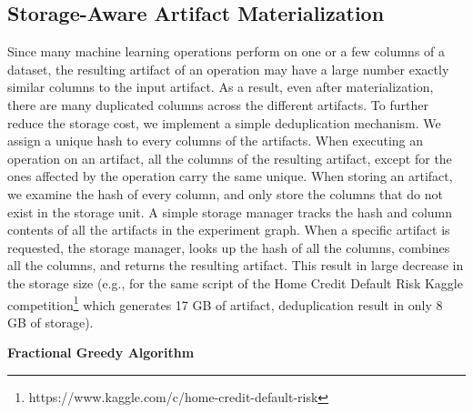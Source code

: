 \subsection{Storage-Aware Artifact Materialization}
Since many machine learning operations perform on one or a few columns of a dataset, the resulting artifact of an operation may have a large number exactly similar columns to the input artifact.
As a result, even after materialization, there are many duplicated columns across the different artifacts.
To further reduce the storage cost, we implement a simple deduplication mechanism.
We assign a unique hash to every columns of the artifacts.
When executing an operation on an artifact, all the columns of the resulting artifact, except for the ones affected by the operation carry the same unique.
When storing an artifact, we examine the hash of every column, and only store the columns that do not exist in the storage unit.
A simple storage manager tracks the hash and column contents of all the artifacts in the experiment graph.
When a specific artifact is requested, the storage manager, looks up the hash of all the columns, combines all the columns, and returns the resulting artifact.
This result in large decrease in the storage size (e.g., for the same script of the Home Credit Default Risk Kaggle competition\footnote{https://www.kaggle.com/c/home-credit-default-risk} which generates 17 GB of artifact, deduplication result in only 8 GB of storage).

\textbf{Fractional Greedy Algorithm}
